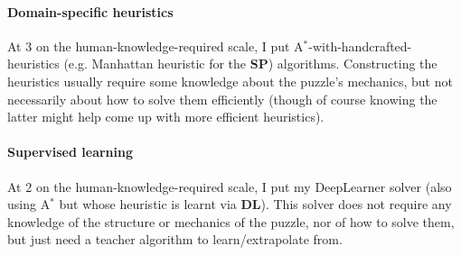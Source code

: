 \paragraph{Domain-specific heuristics}
At 3 on the human-knowledge-required scale, I put A$^{*}$-with-handcrafted-heuristics (e.g. Manhattan heuristic for the \textbf{SP}) algorithms. Constructing the heuristics usually require some knowledge about the puzzle's mechanics, but not necessarily about how to solve them efficiently (though of course knowing the latter might help come up with more efficient heuristics).


\paragraph{Supervised learning}
At 2 on the human-knowledge-required scale, I put my DeepLearner solver (also using A$^{*}$ but whose heuristic is learnt via \textbf{DL}). This solver does not require any knowledge of the structure or mechanics of the puzzle, nor of how to solve them, but just need a teacher algorithm to learn/extrapolate from.


